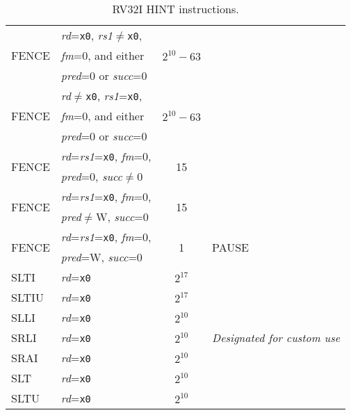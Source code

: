 \begin{table}[hbt]
\begin{tabular}{|l|l|c|l|}
  \multirow{3}{*}{FENCE}& {\em rd}={\tt x0}, {\em rs1}$\neq${\tt x0}, & \multirow{3}{*}{$2^{10}-63$}& \\
                        & {\em fm}=0, and either                      &                             & \\
                        & {\em pred}=0 or {\em succ}=0                &                             & \\ \cline{1-3}
  \multirow{3}{*}{FENCE}& {\em rd}$\neq${\tt x0}, {\em rs1}={\tt x0}, & \multirow{3}{*}{$2^{10}-63$}& \\
                        & {\em fm}=0, and either                      &                             & \\
                        & {\em pred}=0 or {\em succ}=0                &                             & \\ \cline{1-3}
  \multirow{2}{*}{FENCE}& {\em rd}={\em rs1}={\tt x0}, {\em fm}=0,    & \multirow{2}{*}{15}         & \\
                        & {\em pred}=0, {\em succ}$\neq$0             &                             & \\ \cline{1-3}
  \multirow{2}{*}{FENCE}& {\em rd}={\em rs1}={\tt x0}, {\em fm}=0,    & \multirow{2}{*}{15}         & \\
                        & {\em pred}$\neq$W, {\em succ}=0             &                             & \\ \hline
  \multirow{2}{*}{FENCE}& {\em rd}={\em rs1}={\tt x0}, {\em fm}=0,    & \multirow{2}{*}{1}          & \multirow{2}{*}{PAUSE} \\
                        & {\em pred}=W, {\em succ}=0                  &                             & \\ \hline \hline
  SLTI                  & {\em rd}={\tt x0}                           & $2^{17}$                    & \multirow{7}{*}{\em Designated for custom use} \\ \cline{1-3}
  SLTIU                 & {\em rd}={\tt x0}                           & $2^{17}$                    & \\ \cline{1-3}
  SLLI                  & {\em rd}={\tt x0}                           & $2^{10}$                    & \\ \cline{1-3}
  SRLI                  & {\em rd}={\tt x0}                           & $2^{10}$                    & \\ \cline{1-3}
  SRAI                  & {\em rd}={\tt x0}                           & $2^{10}$                    & \\ \cline{1-3}
  SLT                   & {\em rd}={\tt x0}                           & $2^{10}$                    & \\ \cline{1-3}
  SLTU                  & {\em rd}={\tt x0}                           & $2^{10}$                    & \\ \hline
\end{tabular}
\caption{RV32I HINT instructions.}
\label{tab:rv32i-hints}
\end{table}

